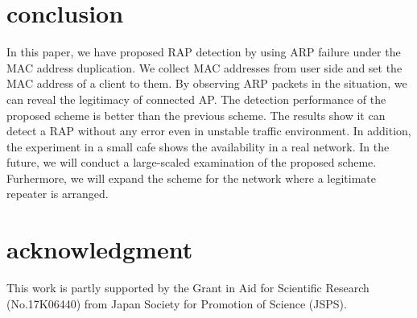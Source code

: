 \documentclass[conference]{IEEEtran}
\begin{document}
\section{conclusion}\label{sec:6}
In this paper, we have proposed RAP detection by using ARP failure under the MAC address duplication.
We collect MAC addresses from user side and set the MAC address of a client to them.
By observing ARP packets in the situation, we can reveal the legitimacy of connected AP.
The detection performance of the proposed scheme is better than the previous scheme.
The results show it can detect a RAP without any error even in unstable traffic environment.
In addition, the experiment in a small cafe shows the availability in a real network.
In the future, we will conduct a large-scaled examination of the proposed scheme.
Furhermore, we will expand the scheme for the network where a legitimate repeater is arranged.

\section*{acknowledgment}
This work is partly supported by the Grant in Aid for Scientific Research (No.17K06440) from Japan Society for Promotion of Science (JSPS).




\vspace{12pt}
\end{document}
